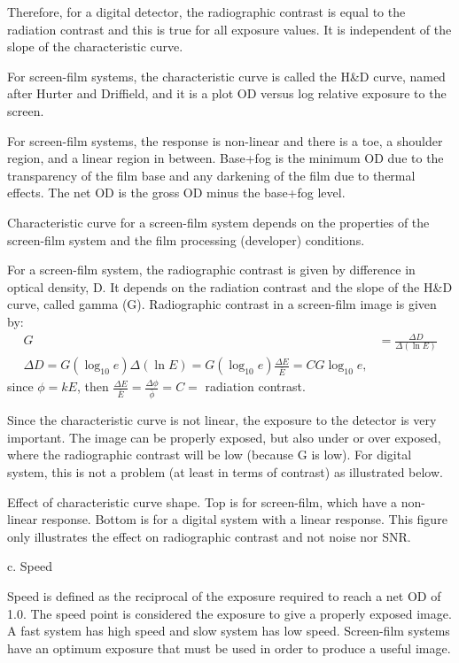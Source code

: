 \documentclass[mphy386-notes.tex]{subfiles}
\begin{document}
Therefore, for a digital detector, the radiographic contrast is equal to the
radiation contrast and this is true for all exposure values. It is independent
of the slope of the characteristic curve.

For screen-film systems, the characteristic curve is called the H\&D curve, named after Hurter and Driffield, and it is a plot OD versus log relative exposure to the screen.

For screen-film systems, the response is non-linear and there is a toe, a
shoulder region, and a linear region in between. Base+fog is the minimum OD due
to the transparency of the film base and any darkening of the film due to
thermal effects. The net OD is the gross OD minus the base+fog level.

Characteristic curve for a screen-film system depends on the properties of the
screen-film system and the film processing (developer) conditions.

For a screen-film system, the radiographic contrast is given by difference in
optical density, D. It depends on the radiation contrast and the slope of the
H\&D curve, called gamma (G). Radiographic contrast in a screen-film image is
given by:
\begin{align}
  G &= \frac{\Delta D}{\Delta(\ln E)}\\
  \Delta D = G(\log_{10}e)\Delta(\ln E) = G(\log_{10}e)\frac{\Delta E}{\bar{E}} = CG\log_{10}e, 
\end{align}
since $\phi = kE$, then $\frac{\Delta E}{\bar{E}} = \frac{\Delta \phi}{\bar{\phi}} = C =$ radiation contrast. 

Since the characteristic curve is not linear, the exposure to the detector is
very important. The image can be properly exposed, but also under or over
exposed, where the radiographic contrast will be low (because G is low).  For
digital system, this is not a problem (at least in terms of contrast) as
illustrated below.

Effect of characteristic curve shape.  Top is for screen-film, which have a
non-linear response. Bottom is for a digital system with a linear response.
This figure only illustrates the effect on radiographic contrast and not noise
nor SNR.

c. Speed 

Speed is defined as the reciprocal of the exposure required to reach a net OD of
1.0. The speed point is considered the exposure to give a properly exposed
image. A fast system has high speed and slow system has low speed.  Screen-film
systems have an optimum exposure that must be used in order to produce a useful
image.
\end{document}
